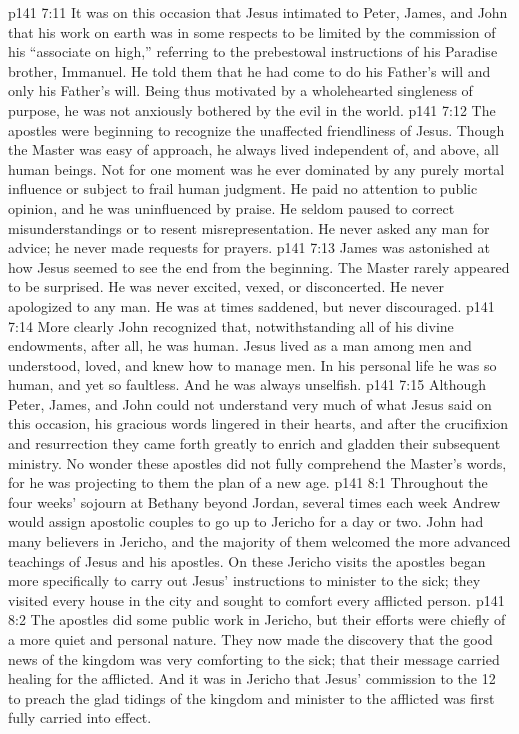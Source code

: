 \vs p141 7:11 It was on this occasion that Jesus intimated to Peter, James, and John that his work on earth was in some respects to be limited by the commission of his “associate on high,” referring to the prebestowal instructions of his Paradise brother, Immanuel. He told them that he had come to do his Father’s will and only his Father’s will. Being thus motivated by a wholehearted singleness of purpose, he was not anxiously bothered by the evil in the world.
\vs p141 7:12 The apostles were beginning to recognize the unaffected friendliness of Jesus. Though the Master was easy of approach, he always lived independent of, and above, all human beings. Not for one moment was he ever dominated by any purely mortal influence or subject to frail human judgment. He paid no attention to public opinion, and he was uninfluenced by praise. He seldom paused to correct misunderstandings or to resent misrepresentation. He never asked any man for advice; he never made requests for prayers.
\vs p141 7:13 James was astonished at how Jesus seemed to see the end from the beginning. The Master rarely appeared to be surprised. He was never excited, vexed, or disconcerted. He never apologized to any man. He was at times saddened, but never discouraged.
\vs p141 7:14 More clearly John recognized that, notwithstanding all of his divine endowments, after all, he was human. Jesus lived as a man among men and understood, loved, and knew how to manage men. In his personal life he was so human, and yet so faultless. And he was always unselfish.
\vs p141 7:15 Although Peter, James, and John could not understand very much of what Jesus said on this occasion, his gracious words lingered in their hearts, and after the crucifixion and resurrection they came forth greatly to enrich and gladden their subsequent ministry. No wonder these apostles did not fully comprehend the Master’s words, for he was projecting to them the plan of a new age.
\vs p141 8:1 Throughout the four weeks’ sojourn at Bethany beyond Jordan, several times each week Andrew would assign apostolic couples to go up to Jericho for a day or two. John had many believers in Jericho, and the majority of them welcomed the more advanced teachings of Jesus and his apostles. On these Jericho visits the apostles began more specifically to carry out Jesus’ instructions to minister to the sick; they visited every house in the city and sought to comfort every afflicted person.
\vs p141 8:2 The apostles did some public work in Jericho, but their efforts were chiefly of a more quiet and personal nature. They now made the discovery that the good news of the kingdom was very comforting to the sick; that their message carried healing for the afflicted. And it was in Jericho that Jesus’ commission to the 12 to preach the glad tidings of the kingdom and minister to the afflicted was first fully carried into effect.
